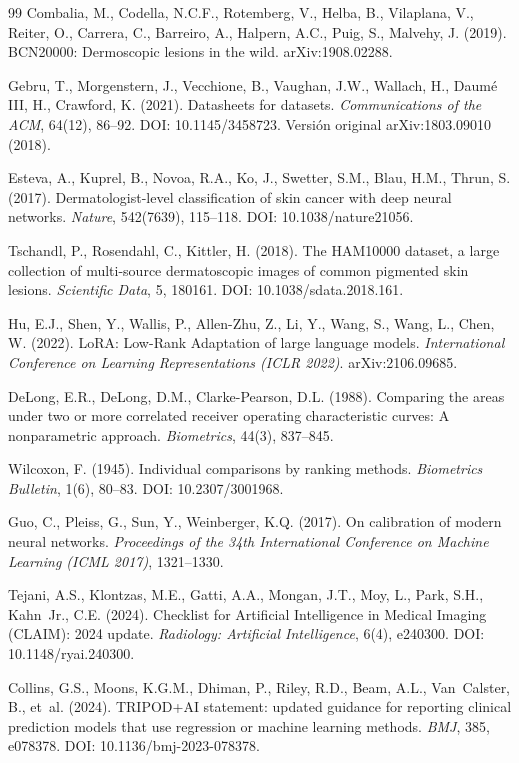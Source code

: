 \begin{thebibliography}{99}
Combalia, M., Codella, N.C.F., Rotemberg, V., Helba, B., Vilaplana, V., Reiter, O., Carrera, C., Barreiro, A., Halpern, A.C., Puig, S., Malvehy, J. (2019). BCN20000: Dermoscopic lesions in the wild. arXiv:1908.02288.

Gebru, T., Morgenstern, J., Vecchione, B., Vaughan, J.W., Wallach, H., Daumé III, H., Crawford, K. (2021). Datasheets for datasets. \emph{Communications of the ACM}, 64(12), 86--92. DOI: 10.1145/3458723. Versión original arXiv:1803.09010 (2018).

Esteva, A., Kuprel, B., Novoa, R.A., Ko, J., Swetter, S.M., Blau, H.M., Thrun, S. (2017). Dermatologist-level classification of skin cancer with deep neural networks. \emph{Nature}, 542(7639), 115--118. DOI: 10.1038/nature21056.

Tschandl, P., Rosendahl, C., Kittler, H. (2018). The HAM10000 dataset, a large collection of multi-source dermatoscopic images of common pigmented skin lesions. \emph{Scientific Data}, 5, 180161. DOI: 10.1038/sdata.2018.161.

Hu, E.J., Shen, Y., Wallis, P., Allen-Zhu, Z., Li, Y., Wang, S., Wang, L., Chen, W. (2022). LoRA: Low-Rank Adaptation of large language models. \emph{International Conference on Learning Representations (ICLR 2022)}. arXiv:2106.09685.

DeLong, E.R., DeLong, D.M., Clarke-Pearson, D.L. (1988). Comparing the areas under two or more correlated receiver operating characteristic curves: A nonparametric approach. \emph{Biometrics}, 44(3), 837--845.

Wilcoxon, F. (1945). Individual comparisons by ranking methods. \emph{Biometrics Bulletin}, 1(6), 80--83. DOI: 10.2307/3001968.

Guo, C., Pleiss, G., Sun, Y., Weinberger, K.Q. (2017). On calibration of modern neural networks. \emph{Proceedings of the 34th International Conference on Machine Learning (ICML 2017)}, 1321--1330.

Tejani, A.S., Klontzas, M.E., Gatti, A.A., Mongan, J.T., Moy, L., Park, S.H., Kahn~Jr., C.E. (2024). Checklist for Artificial Intelligence in Medical Imaging (CLAIM): 2024 update. \emph{Radiology: Artificial Intelligence}, 6(4), e240300. DOI: 10.1148/ryai.240300.

Collins, G.S., Moons, K.G.M., Dhiman, P., Riley, R.D., Beam, A.L., Van~Calster, B., et~al. (2024). TRIPOD+AI statement: updated guidance for reporting clinical prediction models that use regression or machine learning methods. \emph{BMJ}, 385, e078378. DOI: 10.1136/bmj-2023-078378.


\end{thebibliography}
